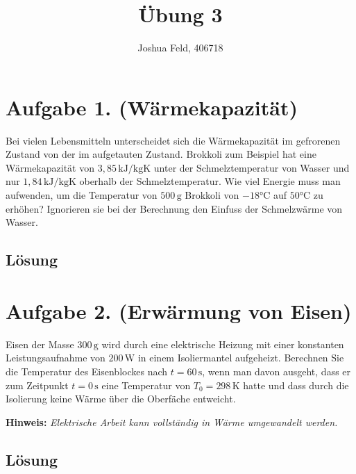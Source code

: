 \documentclass[german,12pt]{homework}
\title{Übung 3}
\author{Joshua Feld, 406718}
\institute{RWTH Aachen University\\Aachener Verfahrenstechnik}
\newcommand{\sis}[1]{\,\si{#1}}
\newcommand{\degC}{\si{\degreeCelsius}}
\begin{document}
    \maketitle

    \section*{Aufgabe 1. (Wärmekapazität)}

    \begin{problem}
        Bei vielen Lebensmitteln unterscheidet sich die Wärmekapazität im
        gefrorenen Zustand von der im aufgetauten Zustand. Brokkoli zum
        Beispiel hat eine Wärmekapazität von \(3,85
        \sis{\kilo\joule\per\kilogram\kelvin}\) unter der Schmelztemperatur von
        Wasser und nur \(1,84\sis{\kilo\joule\per\kilogram\kelvin}\) oberhalb
        der Schmelztemperatur. Wie viel Energie muss man aufwenden, um die
        Temperatur von \(500\sis{\gram}\) Brokkoli von \(-18\degC\) auf
        \(50\degC\) zu erhöhen? Ignorieren sie bei der Berechnung den Einfuss
        der Schmelzwärme von Wasser.
    \end{problem}

    \subsection*{Lösung}

    \section*{Aufgabe 2. (Erwärmung von Eisen)}

    \begin{problem}
        Eisen der Masse \(300\sis{\gram}\) wird durch eine elektrische Heizung
        mit einer konstanten Leistungsaufnahme von \(200\sis{\watt}\) in einem
        Isoliermantel aufgeheizt. Berechnen Sie die Temperatur des
        Eisenblockes nach \(t = 60\sis{\second}\), wenn man davon ausgeht, dass
        er zum Zeitpunkt \(t = 0\sis{\second}\) eine Temperatur von
        \(T_0 = 298\sis{\kelvin}\) hatte und dass durch die Isolierung keine
        Wärme über die Oberfäche entweicht.

        \textbf{Hinweis:} \quad \emph{Elektrische Arbeit kann vollständig in
        Wärme umgewandelt werden.}
    \end{problem}

    \subsection*{Lösung}
\end{document}
